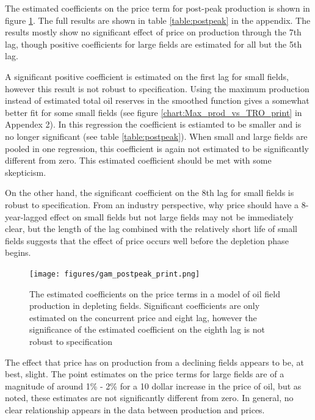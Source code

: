 \documentclass[11pt]{article}
\begin{document}
 The estimated coefficients on the price term for post-peak production is shown in figure \ref{gam_postpeak_print}.  The full results are shown in table \ref{table:postpeak} in the appendix.  The results mostly show no significant effect of price on production through the 7th lag, though positive coefficients for large fields are estimated for all but the 5th lag.  

 A significant positive coefficient is estimated on the first lag for small fields, however this result is not robust to specification.  Using the maximum production instead of estimated total oil reserves in the smoothed function gives a somewhat better fit for some small fields (see figure \ref{chart:Max_prod_vs_TRO_print} in Appendex 2).  In this regression the coefficient is estiamted to be smaller and is no longer significant (see table \ref{table:postpeak}).  When small and large fields are pooled in one regression, this coefficient is again not estimated to be significantly different from zero.  This estimated coefficient should be met with some skepticism.  

 On the other hand, the significant coefficient on the 8th lag for small fields is robust to specification. From an industry perspective, why price should have a 8-year-lagged effect on small fields but not large fields may not be immediately clear, but the length of the lag combined with the relatively short life of small fields suggests that the effect of price occurs well before the depletion phase begins.  

\begin{figure}
	\texttt{[image: figures/gam\_postpeak\_print.png]}
	\caption{The estimated coefficients on the price terms in a model of oil field production in depleting fields.  Significant coefficients are only estimated on the concurrent price and eight lag, however the significance of the estimated coefficient on the eighth lag is not robust to specification}
	\label{gam_postpeak_print}
\end{figure}

The effect that price has on production from a declining fields appears to be, at best, slight.  The point estimates on the price terms for large fields are of a magnitude of around 1\% - 2\% for a 10 dollar increase in the price of oil, but as noted, these estimates are not significantly different from zero.  In general, no clear relationship appears in the data between production and prices.
\end{document}
